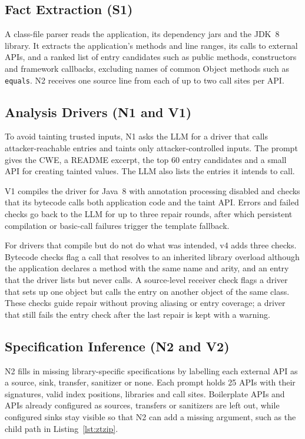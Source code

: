 \documentclass[sigconf]{acmart}
\begin{document}
\subsection{Fact Extraction (S1)}
A class-file parser reads the application, its dependency jars and the JDK~8 library. It extracts the application's methods and line ranges, its calls to external APIs, and a ranked list of entry candidates such as public methods, constructors and framework callbacks, excluding names of common Object methods such as \texttt{equals}. N2 receives one source line from each of up to two call sites per API.

\subsection{Analysis Drivers (N1 and V1)}
To avoid tainting trusted inputs, N1 asks the LLM for a driver that calls attacker-reachable entries and taints only attacker-controlled inputs. The prompt gives the CWE, a README excerpt, the top 60 entry candidates and a small API for creating tainted values. The LLM also lists the entries it intends to call.

V1 compiles the driver for Java~8 with annotation processing disabled and checks that its bytecode calls both application code and the taint API. Errors and failed checks go back to the LLM for up to three repair rounds, after which persistent compilation or basic-call failures trigger the template fallback.

For drivers that compile but do not do what was intended, v4 adds three checks. Bytecode checks flag a call that resolves to an inherited library overload although the application declares a method with the same name and arity, and an entry that the driver lists but never calls. A source-level receiver check flags a driver that sets up one object but calls the entry on another object of the same class. These checks guide repair without proving aliasing or entry coverage; a driver that still fails the entry check after the last repair is kept with a warning.

\subsection{Specification Inference (N2 and V2)}
N2 fills in missing library-specific specifications by labelling each external API as a source, sink, transfer, sanitizer or none. Each prompt holds 25 APIs with their signatures, valid index positions, libraries and call sites. Boilerplate APIs and APIs already configured as sources, transfers or sanitizers are left out, while configured sinks stay visible so that N2 can add a missing argument, such as the child path in Listing~\ref{lst:ztzip}.
\end{document}
